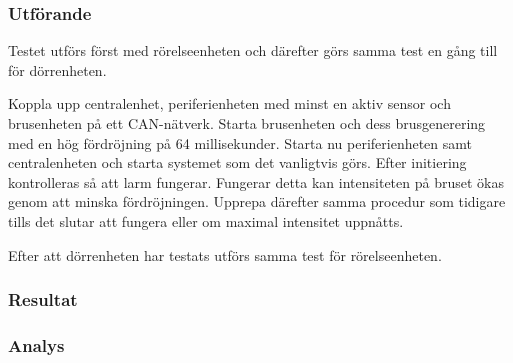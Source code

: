 \subsubsection*{Utförande}
Testet utförs först med rörelseenheten och därefter görs samma test en gång till för dörrenheten.

Koppla upp centralenhet, periferienheten med minst en aktiv sensor och brusenheten på ett CAN-nätverk. Starta brusenheten och dess brusgenerering med en hög fördröjning på 64 millisekunder. Starta nu periferienheten samt centralenheten och starta systemet som det vanligtvis görs. Efter initiering kontrolleras så att larm fungerar. Fungerar detta kan intensiteten på bruset ökas genom att minska fördröjningen. Upprepa därefter samma procedur som tidigare tills det slutar att fungera eller om maximal intensitet uppnåtts.

Efter att dörrenheten har testats utförs samma test för rörelseenheten.


\subsubsection*{Resultat}



\subsubsection*{Analys}




